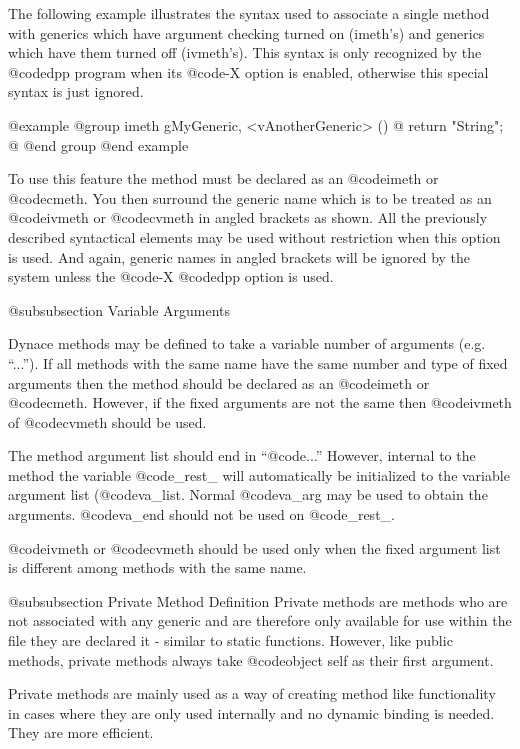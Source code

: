 The following example illustrates the syntax used to associate a single
method with generics which have argument checking turned on (imeth's)
and generics which have them turned off (ivmeth's).  This syntax is
only recognized by the @code{dpp} program when its @code{-X} option is enabled,
otherwise this special syntax is just ignored.


@example
@group
imeth   gMyGeneric, <vAnotherGeneric> ()
@{
        return "String";
@}
@end group
@end example


To use this feature the method must be declared as an @code{imeth} or
@code{cmeth}.  You then surround the generic name which is to be
treated as an @code{ivmeth} or @code{cvmeth} in angled brackets as
shown.  All the previously described syntactical elements may be
used without restriction when this option is used.  And again,
generic names in angled brackets will be ignored by the system unless
the @code{-X} @code{dpp} option is used.




@subsubsection Variable Arguments

Dynace methods may be defined to take a variable number of arguments
(e.g. ``...'').  If all methods with the same name have the same number
and type of fixed arguments then the method should be declared as an
@code{imeth} or @code{cmeth}.  However, if the fixed arguments are not
the same then @code{ivmeth} of @code{cvmeth} should be used.

The method argument list should end in ``@code{...}''  However, internal
to the method the variable @code{_rest_} will automatically be
initialized to the variable argument list (@code{va_list}.  Normal
@code{va_arg} may be used to obtain the arguments.  @code{va_end}
should not be used on @code{_rest_}.

@code{ivmeth} or @code{cvmeth} should be used only when the fixed argument list
is different among methods with the same name.


@subsubsection Private Method Definition
Private methods are methods who are not associated with any generic
and are therefore only available for use within the file they are
declared it - similar to static functions.  However, like public
methods, private methods always take @code{object self} as their
first argument.

Private methods are mainly used as a way of creating method like
functionality in cases where they are only used internally and no
dynamic binding is needed.  They are more efficient.

